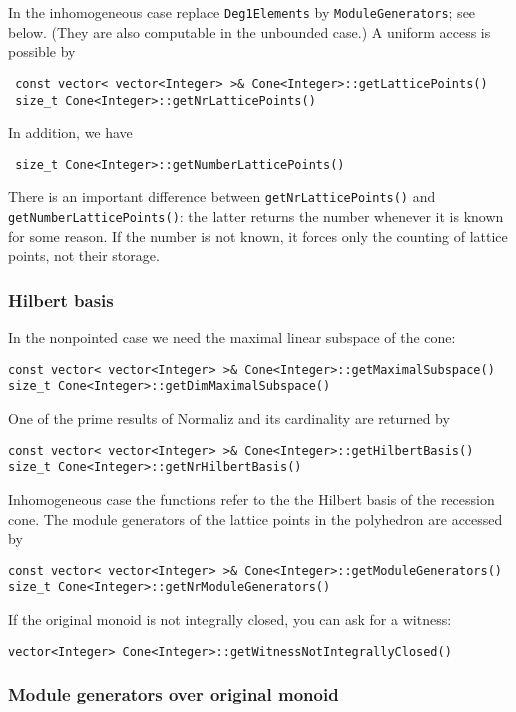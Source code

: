 \documentclass[12pt,a4paper]{scrartcl}
\theoremstyle{definition}
\begin{document}
\begin{small}
In the inhomogeneous case replace \verb|Deg1Elements| by \verb|ModuleGenerators|;  see below. (They are also computable in the unbounded case.)  A uniform access is possible by
 \begin{Verbatim}
 const vector< vector<Integer> >& Cone<Integer>::getLatticePoints()
 size_t Cone<Integer>::getNrLatticePoints()
 \end{Verbatim} 
 
 In addition, we have
 \begin{Verbatim} 
 size_t Cone<Integer>::getNumberLatticePoints()
 \end{Verbatim} 
There is an important difference between \verb|getNrLatticePoints()| and \verb|getNumberLatticePoints()|: the latter  returns the number whenever it is known for some reason. If the number is not known, it forces only the counting of lattice points, not their storage.

\subsubsection{Hilbert basis}

In the nonpointed case we need the maximal linear subspace of the cone:
\begin{Verbatim}
const vector< vector<Integer> >& Cone<Integer>::getMaximalSubspace()
size_t Cone<Integer>::getDimMaximalSubspace()
\end{Verbatim}

One of the prime results of Normaliz and its cardinality are returned by
\begin{Verbatim}
const vector< vector<Integer> >& Cone<Integer>::getHilbertBasis()
size_t Cone<Integer>::getNrHilbertBasis()
\end{Verbatim}
Inhomogeneous case the functions refer to the the Hilbert basis of the recession cone. The module generators of the lattice points in the polyhedron are accessed by
\begin{Verbatim}
const vector< vector<Integer> >& Cone<Integer>::getModuleGenerators()
size_t Cone<Integer>::getNrModuleGenerators()
\end{Verbatim}

If the original monoid is not integrally closed, you can ask for a witness:
\begin{Verbatim}
vector<Integer> Cone<Integer>::getWitnessNotIntegrallyClosed()
\end{Verbatim}

\subsubsection{Module generators over original monoid}


\end{small}
\end{document}
